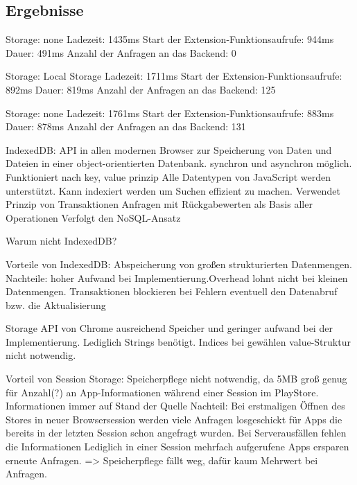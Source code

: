 \subsection{Ergebnisse}
\label{ss:ergebnisseht2}







Storage: none
Ladezeit: 1435ms
Start der Extension-Funktionsaufrufe: 944ms
Dauer: 491ms
Anzahl der Anfragen an das Backend: 0


Storage: Local Storage
Ladezeit: 1711ms
Start der Extension-Funktionsaufrufe: 892ms
Dauer: 819ms
Anzahl der Anfragen an das Backend: 125


Storage: none
Ladezeit: 1761ms
Start der Extension-Funktionsaufrufe: 883ms
Dauer: 878ms
Anzahl der Anfragen an das Backend: 131

IndexedDB: API in allen modernen Browser zur Speicherung von Daten und Dateien in einer object-orientierten Datenbank.
synchron und asynchron möglich.
Funktioniert nach key, value prinzip
Alle Datentypen von JavaScript werden unterstützt.
Kann indexiert werden um Suchen effizient zu machen.
Verwendet Prinzip von Transaktionen
Anfragen mit Rückgabewerten als Basis aller Operationen
Verfolgt den NoSQL-Ansatz

Warum nicht IndexedDB?

Vorteile von IndexedDB: Abspeicherung von großen strukturierten Datenmengen.
Nachteile: hoher Aufwand bei Implementierung.Overhead lohnt nicht bei kleinen Datenmengen. Transaktionen blockieren bei Fehlern  eventuell den Datenabruf bzw. die Aktualisierung

Storage API von Chrome ausreichend Speicher und geringer aufwand bei der Implementierung. Lediglich Strings benötigt. Indices bei gewählen value-Struktur nicht notwendig.

Vorteil von Session Storage: Speicherpflege nicht notwendig, da 5MB groß genug für Anzahl(?) an App-Informationen während einer Session im PlayStore. Informationen immer auf Stand der Quelle
Nachteil: Bei erstmaligen Öffnen des Stores in neuer Browsersession werden viele Anfragen losgeschickt für Apps die bereits in der letzten Session schon angefragt wurden. Bei Serverausfällen fehlen die Informationen
Lediglich in einer Session mehrfach aufgerufene Apps ersparen erneute Anfragen.
=> Speicherpflege fällt weg, dafür kaum Mehrwert bei Anfragen.

